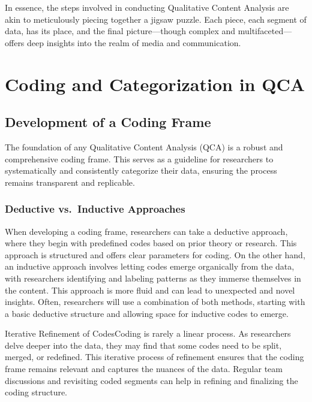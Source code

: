 \documentclass[
  b5paper]{book}
\begin{document}
In essence, the steps involved in conducting Qualitative Content Analysis are akin to meticulously piecing together a jigsaw puzzle. Each piece, each segment of data, has its place, and the final picture---though complex and multifaceted---offers deep insights into the realm of media and communication.

\hypertarget{coding-and-categorization-in-qca}{%
\section{Coding and Categorization in QCA}\label{coding-and-categorization-in-qca}}

\hypertarget{development-of-a-coding-frame}{%
\subsection*{Development of a Coding Frame}\label{development-of-a-coding-frame}}

The foundation of any Qualitative Content Analysis (QCA) is a robust and comprehensive coding frame. This serves as a guideline for researchers to systematically and consistently categorize their data, ensuring the process remains transparent and replicable.

\hypertarget{deductive-vs.-inductive-approaches}{%
\subsubsection*{Deductive vs.~Inductive Approaches}\label{deductive-vs.-inductive-approaches}}

When developing a coding frame, researchers can take a deductive approach, where they begin with predefined codes based on prior theory or research. This approach is structured and offers clear parameters for coding. On the other hand, an inductive approach involves letting codes emerge organically from the data, with researchers identifying and labeling patterns as they immerse themselves in the content. This approach is more fluid and can lead to unexpected and novel insights. Often, researchers will use a combination of both methods, starting with a basic deductive structure and allowing space for inductive codes to emerge.

Iterative Refinement of CodesCoding is rarely a linear process. As researchers delve deeper into the data, they may find that some codes need to be split, merged, or redefined. This iterative process of refinement ensures that the coding frame remains relevant and captures the nuances of the data. Regular team discussions and revisiting coded segments can help in refining and finalizing the coding structure.
\end{document}
